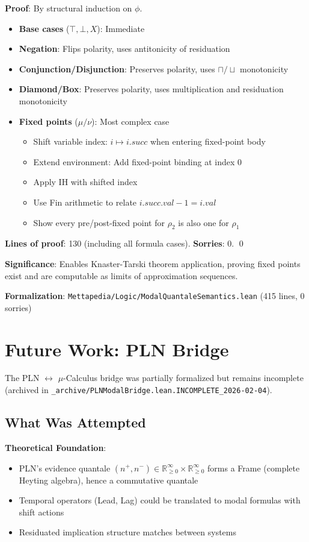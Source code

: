 \documentclass[11pt]{article}
\begin{document}
\textbf{Proof}: By structural induction on $\phi$.
\begin{itemize}
\item \textbf{Base cases} ($\top, \bot, X$): Immediate
\item \textbf{Negation}: Flips polarity, uses antitonicity of residuation
\item \textbf{Conjunction/Disjunction}: Preserves polarity, uses $\sqcap/\sqcup$ monotonicity
\item \textbf{Diamond/Box}: Preserves polarity, uses multiplication and residuation monotonicity
\item \textbf{Fixed points} ($\mu/\nu$): Most complex case
  \begin{itemize}
  \item Shift variable index: $i \mapsto i.succ$ when entering fixed-point body
  \item Extend environment: Add fixed-point binding at index 0
  \item Apply IH with shifted index
  \item Use Fin arithmetic to relate $i.succ.val - 1 = i.val$
  \item Show every pre/post-fixed point for $\rho_2$ is also one for $\rho_1$
  \end{itemize}
\end{itemize}
\textbf{Lines of proof}: 130 (including all formula cases). \textbf{Sorries}: 0. \qed

\textbf{Significance}: Enables Knaster-Tarski theorem application, proving fixed points exist and are computable as limits of approximation sequences.

\textbf{Formalization}: \texttt{Mettapedia/Logic/ModalQuantaleSemantics.lean} (415 lines, 0 sorries)

\section{Future Work: PLN Bridge}

The PLN $\leftrightarrow$ $\mu$-Calculus bridge was partially formalized but remains incomplete (archived in \texttt{\_archive/PLNModalBridge.lean.INCOMPLETE\_2026-02-04}).

\subsection{What Was Attempted}

\textbf{Theoretical Foundation}:
\begin{itemize}
\item PLN's evidence quantale $(n^+, n^-) \in \mathbb{R}_{\geq 0}^\infty \times \mathbb{R}_{\geq 0}^\infty$ forms a Frame (complete Heyting algebra), hence a commutative quantale
\item Temporal operators (Lead, Lag) could be translated to modal formulas with shift actions
\item Residuated implication structure matches between systems
\end{itemize}
\end{document}
